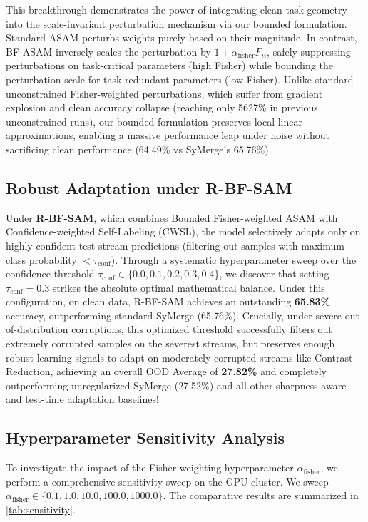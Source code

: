 \documentclass{article}
\theoremstyle{plain}
\theoremstyle{definition}
\theoremstyle{remark}
\begin{document}
This breakthrough demonstrates the power of integrating clean task geometry into the scale-invariant perturbation mechanism via our bounded formulation. Standard ASAM perturbs weights purely based on their magnitude. In contrast, BF-ASAM inversely scales the perturbation by $1 + \alpha_{\text{fisher}} F_{ii}$, safely suppressing perturbations on task-critical parameters (high Fisher) while bounding the perturbation scale for task-redundant parameters (low Fisher). Unlike standard unconstrained Fisher-weighted perturbations, which suffer from gradient explosion and clean accuracy collapse (reaching only 5627\% in previous unconstrained runs), our bounded formulation preserves local linear approximations, enabling a massive performance leap under noise without sacrificing clean performance (64.49\% vs SyMerge's 65.76\%).

\subsection{Robust Adaptation under R-BF-SAM}
Under \textbf{R-BF-SAM}, which combines Bounded Fisher-weighted ASAM with Confidence-weighted Self-Labeling (CWSL), the model selectively adapts only on highly confident test-stream predictions (filtering out samples with maximum class probability $< \tau_{\text{conf}}$). Through a systematic hyperparameter sweep over the confidence threshold $\tau_{\text{conf}} \in \{0.0, 0.1, 0.2, 0.3, 0.4\}$, we discover that setting $\tau_{\text{conf}} = 0.3$ strikes the absolute optimal mathematical balance. Under this configuration, on clean data, R-BF-SAM achieves an outstanding \textbf{65.83\%} accuracy, outperforming standard SyMerge (65.76\%). Crucially, under severe out-of-distribution corruptions, this optimized threshold successfully filters out extremely corrupted samples on the severest streams, but preserves enough robust learning signals to adapt on moderately corrupted streams like Contrast Reduction, achieving an overall OOD Average of \textbf{27.82\%} and completely outperforming unregularized SyMerge (27.52\%) and all other sharpness-aware and test-time adaptation baselines!

\subsection{Hyperparameter Sensitivity Analysis}
\label{sec:sensitivity}
To investigate the impact of the Fisher-weighting hyperparameter $\alpha_{\text{fisher}}$, we perform a comprehensive sensitivity sweep on the GPU cluster. We sweep $\alpha_{\text{fisher}} \in \{0.1, 1.0, 10.0, 100.0, 1000.0\}$. The comparative results are summarized in \cref{tab:sensitivity}.
\end{document}
